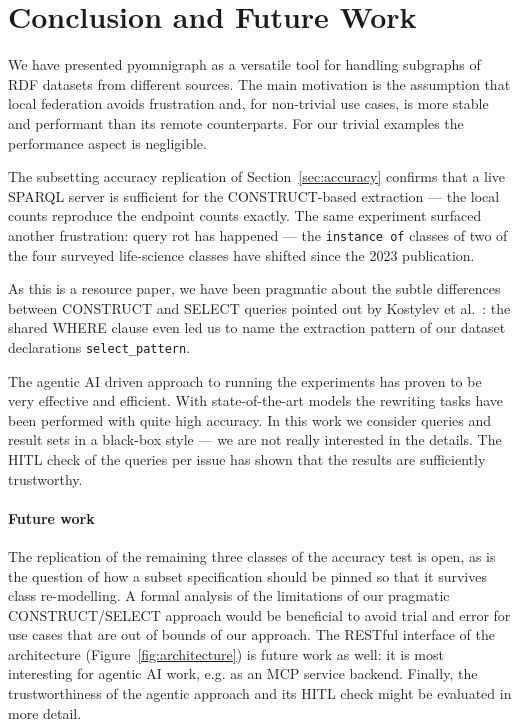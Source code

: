 \documentclass[
]{ceurart}
\begin{document}
\section{Conclusion and Future Work}\label{sec:conclusion}
We have presented pyomnigraph as a versatile tool for handling subgraphs of RDF datasets from different sources. The main motivation is the assumption that local federation avoids frustration and, for non-trivial use cases, is more stable and performant than its remote counterparts. For our trivial examples the performance aspect is negligible.

The subsetting accuracy replication of Section~\ref{sec:accuracy} confirms that a live SPARQL server is sufficient for the CONSTRUCT-based extraction --- the local counts reproduce the endpoint counts exactly. The same experiment surfaced another frustration: query rot has happened --- the \texttt{instance of} classes of two of the four surveyed life-science classes have shifted since the 2023 publication.

As this is a resource paper, we have been pragmatic about the subtle differences between CONSTRUCT and SELECT queries pointed out by Kostylev et al.~\cite{kostylev2015construct}: the shared WHERE clause even led us to name the extraction pattern of our dataset declarations \texttt{select\_pattern}.

The agentic AI driven approach to running the experiments has proven to be very effective and efficient. With state-of-the-art models the rewriting tasks have been performed with quite high accuracy. In this work we consider queries and result sets in a black-box style --- we are not really interested in the details. The HITL check of the queries per issue has shown that the results are sufficiently trustworthy.

\paragraph{Future work}
The replication of the remaining three classes of the accuracy test is
open, as is the question of how a subset specification should be pinned so
that it survives class re-modelling. A formal analysis of the limitations
of our pragmatic CONSTRUCT/SELECT approach would be beneficial to avoid
trial and error for use cases that are out of bounds of our approach. The
RESTful interface of the architecture (Figure~\ref{fig:architecture}) is
future work as well: it is most interesting for agentic AI work, e.g. as an
MCP service backend. Finally, the trustworthiness of the agentic approach
and its HITL check might be evaluated in more detail.
\end{document}
